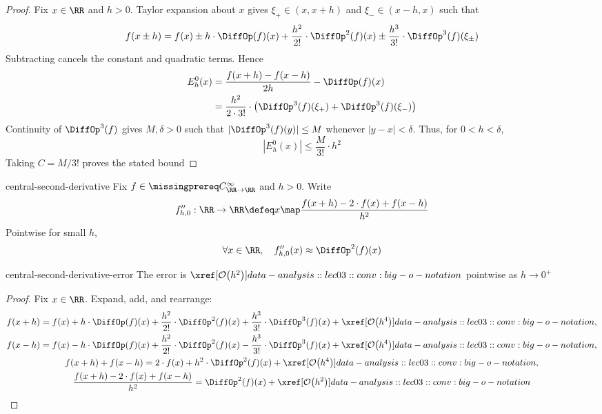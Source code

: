 \documentclass[12pt]{article}
\numberwithin{figure}{section}
\begin{document}
\begin{proof}
  Fix $x\in\RR$ and $h>0$. Taylor expansion about $x$ gives
  $\xi_+\in(x,x+h)$ and $\xi_-\in(x-h,x)$ such that
  \[
    f(x\pm h)=f(x)\pm h\cdot\DiffOp(f)(x)
      +\frac{h^2}{2!}\cdot\DiffOp^2(f)(x)
      \pm\frac{h^3}{3!}\cdot\DiffOp^3(f)(\xi_\pm)
  \]
  Subtracting cancels the constant and quadratic terms. Hence
  \[
    \begin{aligned}
      E_h^0(x)&=\frac{f(x+h)-f(x-h)}{2h}-\DiffOp(f)(x)\\
        &=\frac{h^2}{2\cdot3!}\cdot
          \bigl(\DiffOp^3(f)(\xi_+)+\DiffOp^3(f)(\xi_-)\bigr)
    \end{aligned}
  \]
  Continuity of $\DiffOp^3(f)$ gives $M,\delta>0$ such that
  $|\DiffOp^3(f)(y)|\leq M$ whenever $|y-x|<\delta$.
  Thus, for $0<h<\delta$,
  \[
    |E_h^0(x)|\leq\frac{M}{3!}\cdot h^2
  \]
  Taking $C=M/3!$ proves the stated bound
\end{proof}

\begin{conv}{central-second-derivative}
  Fix $f\in\SmoothRealFunctions$ and $h>0$. Write
  \[
    f''_{h,0}:\RR\to\RR
      \defeq x\map\frac{f(x+h)-2\cdot f(x)+f(x-h)}{h^2}
  \]
  Pointwise for small $h$,
  \[
    \forall x\in\RR,\quad f''_{h,0}(x)\approx\DiffOp^2(f)(x)
  \]
\end{conv}

\begin{prop}{central-second-derivative-error}
  The error is $\OrderOf{h^2}$ pointwise as $h\to0^+$
\end{prop}

\begin{proof}
  Fix $x\in\RR$. Expand, add, and rearrange:
  \[
    \begin{gathered}
      f(x+h)=f(x)+h\cdot\DiffOp(f)(x)
        +\frac{h^2}{2!}\cdot\DiffOp^2(f)(x)
        +\frac{h^3}{3!}\cdot\DiffOp^3(f)(x)+\OrderOf{h^4},\\
      f(x-h)=f(x)-h\cdot\DiffOp(f)(x)
        +\frac{h^2}{2!}\cdot\DiffOp^2(f)(x)
        -\frac{h^3}{3!}\cdot\DiffOp^3(f)(x)+\OrderOf{h^4},\\
      f(x+h)+f(x-h)=2\cdot f(x)
        +h^2\cdot\DiffOp^2(f)(x)+\OrderOf{h^4},\\
      \frac{f(x+h)-2\cdot f(x)+f(x-h)}{h^2}
        =\DiffOp^2(f)(x)+\OrderOf{h^2}
    \end{gathered}
  \]
\end{proof}

\todo[Implement the difference formulas for sine at x=1; compare with the exact derivatives over several step sizes]
\end{document}
